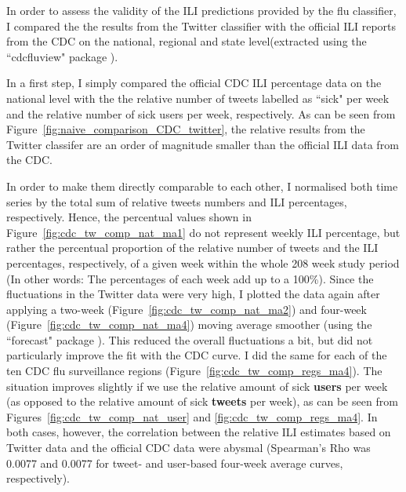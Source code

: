 \documentclass[11pt, a4paper,twoside]{report}\usepackage[]{graphicx}\usepackage[]{color}
\begin{document}
In order to assess the validity of the ILI predictions provided by the flu classifier, I compared the the results from the Twitter classifier with the official ILI reports from the CDC on the national, regional and state level(extracted using the ``cdcfluview" package \citep{cdcfluview}).

In a first step, I simply compared the official CDC ILI percentage data on the national level with the the relative number of tweets labelled as ``sick" per week and the relative number of sick users per week, respectively. As can be seen from Figure~\ref{fig:naive_comparison_CDC_twitter}, the relative results from the Twitter classifer are an order of magnitude smaller than the official ILI data from the CDC.

In order to make them directly comparable to each other, I normalised both time series by the total sum of relative tweets numbers and ILI percentages, respectively. Hence, the percentual values shown in Figure~\ref{fig:cdc_tw_comp_nat_ma1} do not represent weekly ILI percentage, but rather the percentual proportion of the relative number of tweets and the ILI percentages, respectively, of a given week within the whole 208 week study period (In other words: The percentages of each week add up to a 100\%). Since the fluctuations in the Twitter data were very high, I plotted the data again after applying a two-week (Figure~\ref{fig:cdc_tw_comp_nat_ma2}) and four-week (Figure~\ref{fig:cdc_tw_comp_nat_ma4}) moving average smoother (using the ``forecast" package ). This reduced the overall fluctuations a bit, but did not particularly improve the fit with the CDC curve. I did the same for each of the ten CDC flu surveillance regions (Figure~\ref{fig:cdc_tw_comp_regs_ma4}). The situation improves slightly if we use the relative amount of sick \textbf{users} per week (as opposed to the relative amount of sick \textbf{tweets} per week), as can be seen  from Figures~\ref{fig:cdc_tw_comp_nat_user} and \ref{fig:cdc_tw_comp_regs_ma4}. In both cases, however, the correlation between the relative ILI estimates based on Twitter data and the official CDC data were abysmal (Spearman's Rho was 0.0077 and 0.0077 for tweet- and user-based four-week average curves, respectively). 
\end{document}
